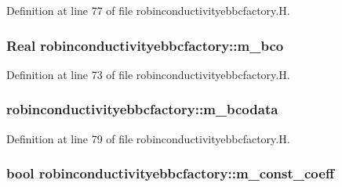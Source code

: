 Definition at line 77 of file robinconductivityebbcfactory.\+H.

\subsubsection[{\texorpdfstring{m\+\_\+bco}{m_bco}}]{\setlength{\rightskip}{0pt plus 5cm}Real robinconductivityebbcfactory\+::m\+\_\+bco\hspace{0.3cm}{\ttfamily [protected]}}\hypertarget{classrobinconductivityebbcfactory_acd5793e2a3d30e094a16ea223ac11340}{}\label{classrobinconductivityebbcfactory_acd5793e2a3d30e094a16ea223ac11340}


Definition at line 73 of file robinconductivityebbcfactory.\+H.

\subsubsection[{\texorpdfstring{m\+\_\+bcodata}{m_bcodata}}]{ robinconductivityebbcfactory\+::m\+\_\+bcodata\hspace{0.3cm}{\ttfamily [protected]}}\hypertarget{classrobinconductivityebbcfactory_a99480bfa78988fc3e45649bfb648872f}{}\label{classrobinconductivityebbcfactory_a99480bfa78988fc3e45649bfb648872f}


Definition at line 79 of file robinconductivityebbcfactory.\+H.

\subsubsection[{\texorpdfstring{m\+\_\+const\+\_\+coeff}{m_const_coeff}}]{\setlength{\rightskip}{0pt plus 5cm}bool robinconductivityebbcfactory\+::m\+\_\+const\+\_\+coeff\hspace{0.3cm}{\ttfamily [protected]}}\hypertarget{classrobinconductivityebbcfactory_a4f8bf8e60ffae2d9a86da0de037c6a2c}{}\label{classrobinconductivityebbcfactory_a4f8bf8e60ffae2d9a86da0de037c6a2c}


